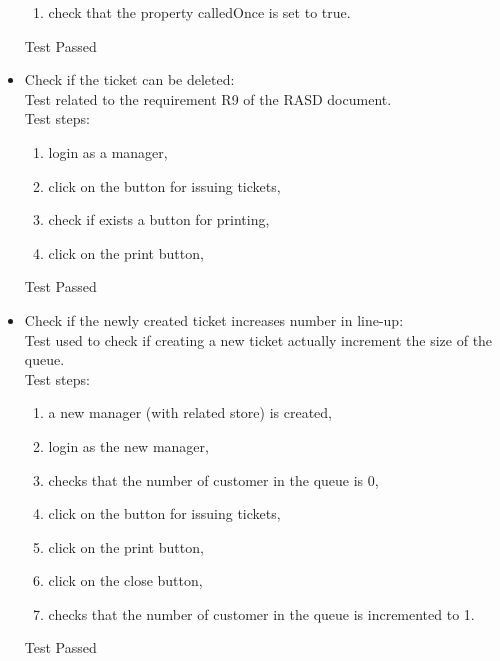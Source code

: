 \begin{itemize}
\begin{enumerate}
        \item check that the property calledOnce is set to true.
    \end{enumerate}
    Test Passed \\

    \item Check if the ticket can be deleted: \\
    Test related to the requirement R9 of the RASD document. \\
    Test steps: \\
    \begin{enumerate}
        \item login as a manager,

        \item click on the button for issuing tickets,

        \item check if exists a button for printing,

        \item click on the print button,
    \end{enumerate}
    Test Passed\\

    \item Check if the newly created ticket increases number in line-up: \\
    Test used to check if creating a new ticket actually increment the size of the queue. \\
    Test steps: \\
    \begin{enumerate}
        \item a new manager (with related store) is created,

        \item login as the new manager,

        \item checks that the number of customer in the queue is 0,

        \item click on the button for issuing tickets,

        \item click on the print button,

        \item click on the close button,

        \item checks that the number of customer in the queue is incremented to 1.
    \end{enumerate}
    Test Passed


\end{itemize}
